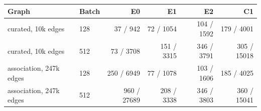 \begin{tabular}{llrrrr}
\toprule
Graph & Batch & E0 & E1 & E2 & C1\\\midrule
curated, 10k edges & 128 & 37 / 942 & 72 / 1054 & 104 / 1592 & 179 / 4001\\
curated, 10k edges & 512 & 73 / 3708 & 151 / 3315 & 346 / 3791 & 305 / 15018\\
\midrule
association, 247k edges & 128 & 250 / 6949 & 77 / 1078 & 103 / 1606 & 185 / 4025\\
association, 247k edges & 512 & 960 / 27689 & 208 / 3338 & 346 / 3803 & 360 / 15041\\
\bottomrule
\end{tabular}